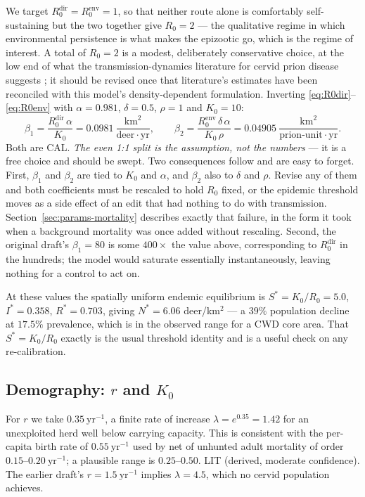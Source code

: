 \documentclass[11pt]{article}
\newcommand{\tagLIT}{{\footnotesize\textsf{\textcolor{green!40!black}{LIT}}}}
\newcommand{\tagCAL}{{\footnotesize\textsf{\textcolor{orange!75!black}{CAL}}}}
\begin{document}
We target $R_0^{\mathrm{dir}} = R_0^{\mathrm{env}} = 1$, so that neither route alone is comfortably self-sustaining but the two together give $R_0 = 2$ --- the qualitative regime in which environmental persistence is what makes the epizootic go, which is the regime of interest. A total of $R_0 = 2$ is a modest, deliberately conservative choice, at the low end of what the transmission-dynamics literature for cervid prion disease suggests \citep{Miller2006}; it should be revised once that literature's estimates have been reconciled with this model's density-dependent formulation. Inverting \eqref{eq:R0dir}--\eqref{eq:R0env} with $\alpha = 0.981$, $\delta = 0.5$, $\rho = 1$ and $K_0 = 10$:
\[
\beta_1 = \frac{R_0^{\mathrm{dir}}\,\alpha}{K_0} = 0.0981\ \frac{\mathrm{km}^2}{\text{deer}\cdot\mathrm{yr}},
\qquad
\beta_2 = \frac{R_0^{\mathrm{env}}\,\delta\,\alpha}{K_0\,\rho} = 0.04905\ \frac{\mathrm{km}^2}{\text{prion-unit}\cdot\mathrm{yr}}.
\]
Both are \tagCAL{}. \emph{The even 1:1 split is the assumption, not the numbers} --- it is a free choice and should be swept. Two consequences follow and are easy to forget. First, $\beta_1$ and $\beta_2$ are tied to $K_0$ and $\alpha$, and $\beta_2$ also to $\delta$ and $\rho$. Revise any of them and both coefficients must be rescaled to hold $R_0$ fixed, or the epidemic threshold moves as a side effect of an edit that had nothing to do with transmission. Section~\ref{sec:params-mortality} describes exactly that failure, in the form it took when a background mortality was once added without rescaling. Second, the original draft's $\beta_1 = 80$ is some $400\times$ the value above, corresponding to $R_0^{\mathrm{dir}}$ in the hundreds; the model would saturate essentially instantaneously, leaving nothing for a control to act on.

At these values the spatially uniform endemic equilibrium is $S^* = K_0/R_0 = 5.0$, $I^* = 0.358$, $R^* = 0.703$, giving $N^* = 6.06$ deer/km$^2$ --- a $39\%$ population decline at $17.5\%$ prevalence, which is in the observed range for a CWD core area. That $S^* = K_0/R_0$ exactly is the usual threshold identity and is a useful check on any re-calibration.

\subsection{Demography: $r$ and $K_0$}

For $r$ we take $0.35\ \mathrm{yr}^{-1}$, a finite rate of increase $\lambda = e^{0.35} = 1.42$ for an unexploited herd well below carrying capacity. This is consistent with the per-capita birth rate of $0.55\ \mathrm{yr}^{-1}$ used by \citet{Almberg2011} net of unhunted adult mortality of order $0.15$--$0.20\ \mathrm{yr}^{-1}$; a plausible range is $0.25$--$0.50$. \tagLIT{} (derived, moderate confidence). The earlier draft's $r = 1.5\ \mathrm{yr}^{-1}$ implies $\lambda = 4.5$, which no cervid population achieves.
\end{document}
